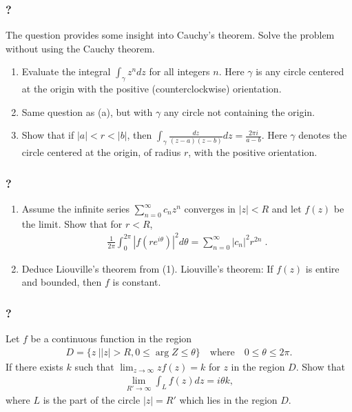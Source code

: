 \hypertarget{section-127}{%
\subsubsection{?}\label{section-127}}

The question provides some insight into Cauchy's theorem. Solve the
problem without using the Cauchy theorem.

\begin{enumerate}
\def\labelenumi{\arabic{enumi}.}
\item
  Evaluate the integral \(\displaystyle{\int_{\gamma} z^n dz}\) for all
  integers \(n\). Here \(\gamma\) is any circle centered at the origin
  with the positive (counterclockwise) orientation.
\item
  Same question as (a), but with \(\gamma\) any circle not containing
  the origin.
\item
  Show that if \(|a|<r<|b|\), then
  \(\displaystyle{\int_{\gamma}\frac{dz}{(z-a)(z-b)} dz=\frac{2\pi i}{a-b}}\).
  Here \(\gamma\) denotes the circle centered at the origin, of radius
  \(r\), with the positive orientation.
\end{enumerate}

\hypertarget{section-128}{%
\subsubsection{?}\label{section-128}}

\begin{enumerate}
\def\labelenumi{(\arabic{enumi})}
\item
  Assume the infinite series \(\displaystyle \sum_{n=0}^\infty c_n z^n\)
  converges in \(|z| < R\) and let \(f(z)\) be the limit. Show that for
  \(r <R\),
  \begin{align*}\frac{1}{2 \pi} \int_0^{2 \pi} |f(r e^{i \theta})|^2 d \theta =
  \sum_{n=0}^\infty |c_n|^2 r^{2n} \; .\end{align*}
\item
  Deduce Liouville's theorem from (1). Liouville's theorem: If \(f(z)\)
  is entire and bounded, then \(f\) is constant.
\end{enumerate}

\hypertarget{section-129}{%
\subsubsection{?}\label{section-129}}

Let \(f\) be a continuous function in the region
\begin{align*}D=\{z\ |  |z|>R, 0\leq \arg Z\leq \theta\}\quad\text{where}\quad
0\leq \theta \leq 2\pi.\end{align*}
If there exists \(k\) such that
\(\displaystyle{\lim_{z\to\infty} zf(z)=k}\) for \(z\) in the region
\(D\). Show that
\begin{align*}\lim_{R'\to\infty} \int_{L} f(z) dz=i\theta k,\end{align*}
where \(L\) is the part of the circle \(|z|=R'\) which lies in the
region \(D\).


